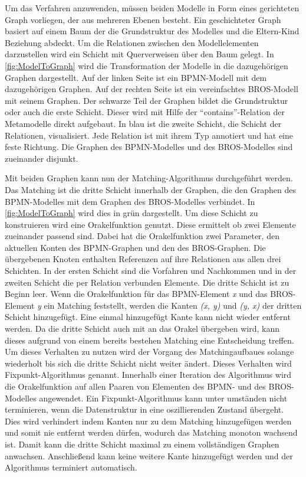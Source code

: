 Um das Verfahren anzuwenden, müssen beiden Modelle in Form eines gerichteten Graph vorliegen, der aus mehreren Ebenen besteht.
Ein geschichteter Graph basiert auf einem Baum der die Grundstruktur des Modelles und die Eltern-Kind Beziehung abdeckt.
Um die Relationen zwischen den Modellelementen darzustellen wird ein Schicht mit Querverweisen über den Baum gelegt.
In \cref{fig:ModelToGraph} wird die Transformation der Modelle in die dazugehörigen Graphen dargestellt.
Auf der linken Seite ist ein BPMN-Modell mit dem dazugehörigen Graphen. 
Auf der rechten Seite ist ein vereinfachtes BROS-Modell mit seinem Graphen.
Der schwarze Teil der Graphen bildet die Grundstruktur oder auch die erste Schicht.
Dieser wird mit Hilfe der ``contains''-Relation der Metamodelle direkt aufgebaut.
In blau ist die zweite Schicht, die Schicht der Relationen, visualisiert.
Jede Relation ist mit ihrem Typ annotiert und hat eine feste Richtung.
Die Graphen des BPMN-Modelles und des BROS-Modelles sind zueinander disjunkt.

Mit beiden Graphen kann nun der Matching-Algorithmus durchgeführt werden.
Das Matching ist die dritte Schicht innerhalb der Graphen, die den Graphen des BPMN-Modelles mit dem Graphen des BROS-Modelles verbindet.
In \cref{fig:ModelToGraph} wird dies in grün dargestellt.
Um diese Schicht zu konstruieren wird eine Orakelfunktion genutzt.
Diese ermittelt ob zwei Elemente zueinander passend sind.
Dabei hat die Orakelfunktion zwei Parameter, den aktuellen Konten des BPMN-Graphen und den des BROS-Graphen.
Die übergebenen Knoten enthalten Referenzen auf ihre Relationen aus allen drei Schichten.
In der ersten Schicht sind die Vorfahren und Nachkommen und in der zweiten Schicht die per Relation verbunden Elemente.
Die dritte Schicht ist zu Beginn leer.
Wenn die Orakelfunktion für das BPMN-Element \emph{x} und das BROS-Element \emph{y} ein Matching feststellt, werden die Kanten \emph{(x, y)} und \emph{(y, x)} der dritten Schicht hinzugefügt.
Eine einmal hinzugefügt Kante kann nicht wieder entfernt werden.
Da die dritte Schicht auch mit an das Orakel übergeben wird, kann dieses aufgrund von einem bereits bestehen Matching eine Entscheidung treffen.
Um dieses Verhalten zu nutzen wird der Vorgang des Matchingaufbaues solange wiederholt bis sich die dritte Schicht nicht weiter ändert.
Dieses Verhalten wird Fixpunkt-Algorithmus genannt.
Innerhalb einer Iteration des Algorithmus wird die Orakelfunktion auf allen Paaren von Elementen des BPMN- und des BROS-Modelles angewendet.
Ein Fixpunkt-Algorithmus kann unter umständen nicht terminieren, wenn die Datenstruktur in eine oszillierenden Zustand übergeht.
Dies wird verhindert indem Kanten nur zu dem Matching hinzugefügen werden und somit nie entfernt werden dürfen, wodurch das Matching monoton wachsend ist.
Damit kann die dritte Schicht maximal zu einem vollständigen Graphen anwachsen.
Anschließend kann keine weitere Kante hinzugefügt werden und der Algorithmus terminiert automatisch.

